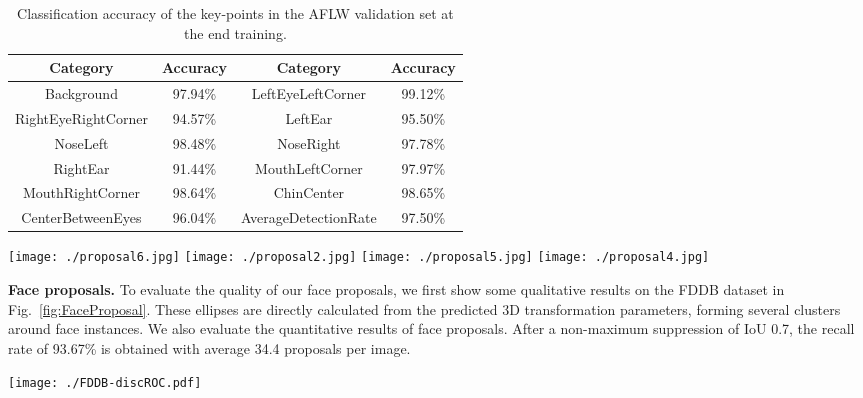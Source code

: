 \documentclass[runningheads]{llncs}
\begin{document}
\begin{table} [t!]
\centering
\begin{tabular}{| c | c | c | c |}
 \hline
 Category &  Accuracy & Category &  Accuracy \\ \hline
 Background & 97.94\% & LeftEyeLeftCorner & 99.12\% \\
 RightEyeRightCorner & 94.57\% & LeftEar & 95.50\% \\
 NoseLeft & 98.48\% & NoseRight & 97.78\% \\
 RightEar & 91.44\% & MouthLeftCorner & 97.97\% \\
 MouthRightCorner & 98.64\% & ChinCenter & 98.65\% \\
 CenterBetweenEyes  & 96.04\% & AverageDetectionRate & 97.50\% \\ \hline
\end{tabular}
\vspace{1em}
\caption{Classification accuracy of the key-points in the AFLW validation set at the end training. }
\label{table:ClsResult} \vspace{-3mm}
\end{table}

\begin{figure*} \centering
\texttt{[image: ./proposal6.jpg]}
\texttt{[image: ./proposal2.jpg]}
\texttt{[image: ./proposal5.jpg]}
\texttt{[image: ./proposal4.jpg]}
\caption{Examples of face proposals  computed using predicted 3D transformation parameters without non-maximum suppression. For clarity, we randomly sample 1/30 of the original number of proposals.}\label{fig:FaceProposal}
\end{figure*}

\textbf{Face proposals.} To evaluate the quality of our face proposals, we first show some qualitative results on the FDDB dataset in Fig.~\ref{fig:FaceProposal}. These ellipses are directly calculated from the predicted 3D transformation parameters,  forming several clusters around  face instances. We also evaluate the quantitative results of face proposals.  After a non-maximum suppression of IoU 0.7,  the recall rate of 93.67\% is obtained with  average 34.4 proposals per image.



\begin{figure*}[h!]
\centering
\texttt{[image: ./FDDB-discROC.pdf]}
\caption{FDDB results based on discrete scores using face bounding boxes in evaluation. The recall rates are computed against 2000 false positives.}\label{fig:fddb-discROC}\vspace{-3mm}
\end{figure*}
\end{document}

